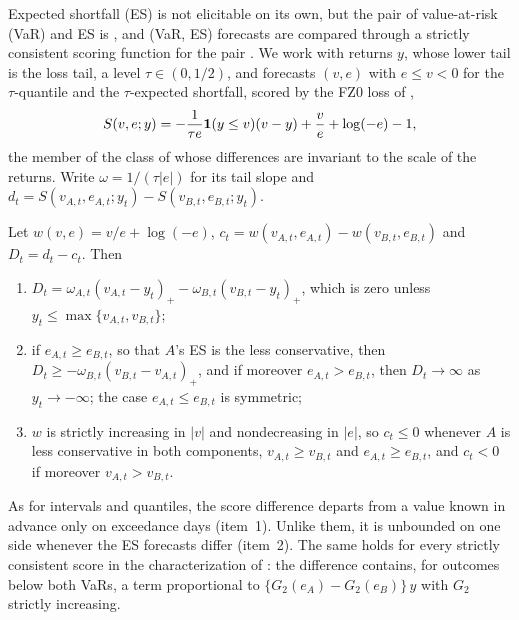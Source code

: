 Expected shortfall (ES) is not elicitable on its own, but the pair of
value-at-risk (VaR) and ES is \citep{fissler2016higher}, and (VaR, ES)
forecasts are compared through a strictly consistent scoring function for
the pair \citep{nolde2017elicitability}. We work with returns $y$, whose
lower tail is the loss tail, a level $\tau\in(0,1/2)$, and forecasts $(v,e)$
with $e\le v<0$ for the $\tau$-quantile and the $\tau$-expected shortfall,
scored by the FZ0 loss of \citet{patton2019dynamic},
\begin{equation}
 S(v,e;y)=-\frac{1}{\tau e}\mathbf{1}(y\le v)(v-y)+\frac ve+\log(-e)-1 ,
 \label{eq:fz0}
\end{equation}
the member of the class of \citet{fissler2016higher} whose differences are
invariant to the scale of the returns. Write $\omega=1/(\tau|e|)$ for its
tail slope and $d_t=S(v_{A,t},e_{A,t};y_t)-S(v_{B,t},e_{B,t};y_t)$.

\begin{lemma}
\label{lem:fz0}
Let $w(v,e)=v/e+\log(-e)$, $c_t=w(v_{A,t},e_{A,t})-w(v_{B,t},e_{B,t})$ and
$D_t=d_t-c_t$. Then
\begin{enumerate}
\item $D_t=\omega_{A,t}(v_{A,t}-y_t)_+-\omega_{B,t}(v_{B,t}-y_t)_+$, which is zero
 unless $y_t\le\max\{v_{A,t},v_{B,t}\}$;
\item if $e_{A,t}\ge e_{B,t}$, so that $A$'s ES is the less conservative,
 then $D_t\ge-\omega_{B,t}(v_{B,t}-v_{A,t})_+$, and if moreover
 $e_{A,t}>e_{B,t}$, then $D_t\to\infty$ as $y_t\to-\infty$; the case
 $e_{A,t}\le e_{B,t}$ is symmetric;
\item $w$ is strictly increasing in $|v|$ and nondecreasing in $|e|$, so
 $c_t\le0$ whenever $A$ is less conservative in both components,
 $v_{A,t}\ge v_{B,t}$ and $e_{A,t}\ge e_{B,t}$, and $c_t<0$ if moreover
 $v_{A,t}>v_{B,t}$.
\end{enumerate}
\end{lemma}

As for intervals and quantiles, the score difference departs from a value
known in advance only on exceedance days (item~1). Unlike them, it is
unbounded on one side whenever the ES forecasts differ (item~2). The same holds for every strictly consistent score in the
characterization of \citet{fissler2016higher}: the difference contains, for
outcomes below both VaRs, a term proportional to $\{G_2(e_A)-G_2(e_B)\}\,y$
with $G_2$ strictly increasing.

